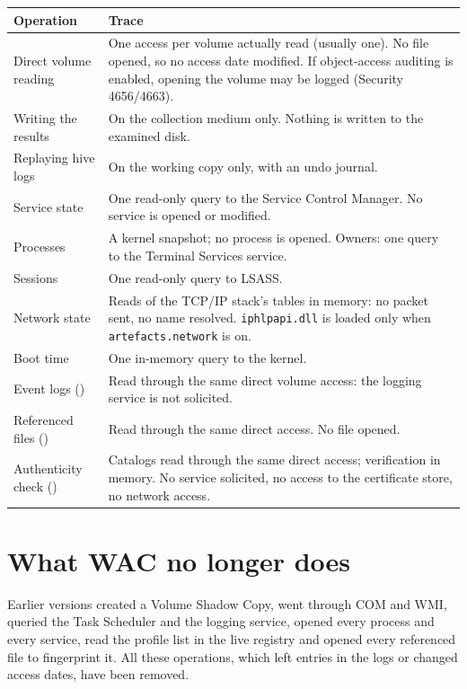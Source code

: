 \documentclass[11pt,a4paper,oneside]{report}
\begin{document}
\begin{longtable}{@{}L{4.3cm}L{10.1cm}@{}}
\toprule
\bfseries Operation & \bfseries Trace \\
\midrule
\endhead
Direct volume reading & One access per volume actually read (usually one). No
  file opened, so no access date modified. If object-access auditing is enabled,
  opening the volume may be logged (Security 4656/4663). \\
Writing the results & On the collection medium only. Nothing is written to the
  examined disk. \\
Replaying hive logs & On the working copy only, with an undo journal. \\
Service state & One read-only query to the Service Control Manager. No service
  is opened or modified. \\
Processes & A kernel snapshot; no process is opened. Owners: one query to the
  Terminal Services service. \\
Sessions & One read-only query to LSASS. \\
Network state & Reads of the TCP/IP stack's tables in memory: no packet sent,
  no name resolved. \texttt{iphlpapi.dll} is loaded only when
  \texttt{artefacts.network} is on. \\
Boot time & One in-memory query to the kernel. \\
Event logs () & Read through the same direct volume access: the
  logging service is not solicited. \\
Referenced files () & Read through the same direct access. No file
  opened. \\
Authenticity check () & Catalogs read through the same direct
  access; verification in memory. No service solicited, no access to the
  certificate store, no network access. \\
\bottomrule
\end{longtable}

\section{What WAC no longer does}

Earlier versions created a Volume Shadow Copy, went through COM and WMI, queried
the Task Scheduler and the logging service, opened every process and every
service, read the profile list in the live registry and opened every referenced
file to fingerprint it. All these operations, which left entries in the logs or
changed access dates, have been removed.
\end{document}
